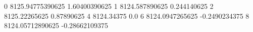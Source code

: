 0 8125.94775390625 1.60400390625
1 8124.587890625 0.244140625
2 8125.22265625 0.87890625
4 8124.34375 0.0
6 8124.0947265625 -0.2490234375
8 8124.05712890625 -0.28662109375
